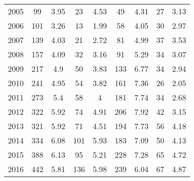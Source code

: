 \begin{table}[htbp]
\begin{tabular}{l*{8}{c}}
2005      &       99&     3.95&       23&     4.53&       49&     4.31&       27&     3.13\\
2006      &      101&     3.26&       13&     1.99&       58&     4.05&       30&     2.97\\
2007      &      139&     4.03&       21&     2.72&       81&     4.99&       37&     3.53\\
2008      &      157&     4.09&       32&     3.16&       91&     5.29&       34&     3.07\\
2009      &      217&      4.9&       50&     3.83&      133&     6.77&       34&     2.94\\
2010      &      241&     4.95&       54&     3.82&      161&     7.36&       26&     2.05\\
2011      &      273&      5.4&       58&        4&      181&     7.74&       34&     2.68\\
2012      &      322&     5.92&       74&     4.91&      206&     7.92&       42&     3.15\\
2013      &      321&     5.92&       71&     4.51&      194&     7.73&       56&     4.18\\
2014      &      334&     6.08&      101&     5.93&      183&     7.09&       50&     4.13\\
2015      &      388&     6.13&       95&     5.21&      228&     7.28&       65&     4.72\\
2016      &      442&     5.81&      136&     5.98&      239&     6.04&       67&     4.87\\
\hline\hline
\end{tabular}
\end{table}
